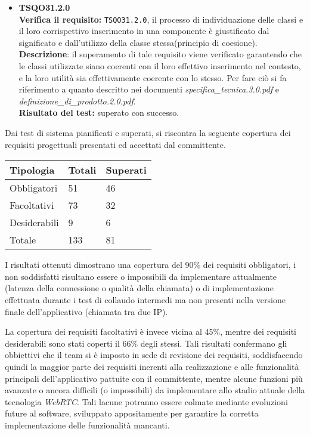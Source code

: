 \begin{itemize}
\item \textbf{TSQO31.2.0}\\
\textbf{Verifica il requisito:} \texttt{TSQO31.2.0}, il processo di individuazione delle classi e il loro corrispettivo inserimento in una componente è giustificato dal significato e dall'utilizzo della classe stessa(principio di coesione).
\textbf{Descrizione}: il superamento di tale requisito viene verificato garantendo che le classi utilizzate siano coerenti con il loro effettivo inserimento nel contesto, e la loro utilità sia effettivamente coerente con lo stesso. Per fare ciò si fa riferimento a quanto descritto nei documenti \textit{specifica\_tecnica.3.0.pdf} e \textit{definizione\_di\_prodotto.2.0.pdf}.\\
\textbf{Risultato del test:} superato con successo.

\end{itemize}

Dai test di sistema pianificati e superati, si riscontra la seguente copertura dei requisiti progettuali presentati ed accettati dal committente.

\begin{center}
\begin{longtable}{p{}ll}
\toprule Tipologia & Totali  & Superati\\
\midrule

Obbligatori & 51 & 46\\
Facoltativi & 73 & 32\\
Desiderabili & 9 & 6\\
\bottomrule
Totale &133 & 81\\
\end{longtable}
\end{center}

I risultati ottenuti dimostrano una copertura del 90\% dei requisiti obbligatori, i non soddisfatti risultano essere o impossibili da implementare attualmente (latenza della connessione o qualità della chiamata) o di implementazione effettuata durante i test di collaudo intermedi ma non presenti nella versione finale dell'applicativo (chiamata tra due IP).

La copertura dei requisiti facoltativi è invece vicina al 45\%, mentre dei requisiti desiderabili sono stati coperti il 66\% degli stessi.
Tali risultati confermano gli obbiettivi che il team si è imposto in sede di revisione dei requisiti, soddisfacendo quindi la maggior parte dei requisiti inerenti alla realizzazione e alle funzionalità principali dell'applicativo pattuite con il committente, mentre alcune funzioni più avanzate o ancora difficili (o impossibili) da implementare allo stadio attuale della tecnologia \textit{WebRTC}. Tali lacune potranno essere colmate mediante evoluzioni future al software, sviluppato appositamente per garantire la corretta implementazione delle funzionalità mancanti.

